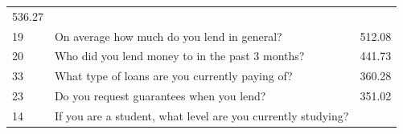 \begin{longtable}[]{@{}lll@{}}
\begin{minipage}[t]{0.09\columnwidth}
536.27\strut
\end{minipage}\tabularnewline
\begin{minipage}[t]{0.05\columnwidth}\raggedright
19\strut
\end{minipage} & \begin{minipage}[t]{0.77\columnwidth}\raggedright
On average how much do you lend in general?\strut
\end{minipage} & \begin{minipage}[t]{0.09\columnwidth}\raggedright
512.08\strut
\end{minipage}\tabularnewline
\begin{minipage}[t]{0.05\columnwidth}\raggedright
20\strut
\end{minipage} & \begin{minipage}[t]{0.77\columnwidth}\raggedright
Who did you lend money to in the past 3 months?\strut
\end{minipage} & \begin{minipage}[t]{0.09\columnwidth}\raggedright
441.73\strut
\end{minipage}\tabularnewline
\begin{minipage}[t]{0.05\columnwidth}\raggedright
33\strut
\end{minipage} & \begin{minipage}[t]{0.77\columnwidth}\raggedright
What type of loans are you currently paying of?\strut
\end{minipage} & \begin{minipage}[t]{0.09\columnwidth}\raggedright
360.28\strut
\end{minipage}\tabularnewline
\begin{minipage}[t]{0.05\columnwidth}\raggedright
23\strut
\end{minipage} & \begin{minipage}[t]{0.77\columnwidth}\raggedright
Do you request guarantees when you lend?\strut
\end{minipage} & \begin{minipage}[t]{0.09\columnwidth}\raggedright
351.02\strut
\end{minipage}\tabularnewline
\begin{minipage}[t]{0.05\columnwidth}\raggedright
14\strut
\end{minipage} & \begin{minipage}[t]{0.77\columnwidth}\raggedright
If you are a student, what level are you currently studying?\strut
\end{minipage} & \begin{minipage}[t]{0.09\columnwidth}\raggedright

\end{minipage}
\end{longtable}
